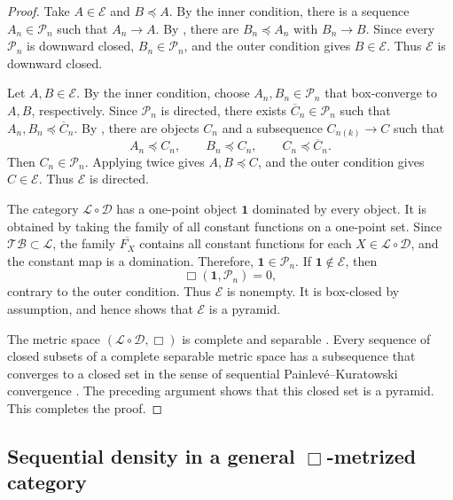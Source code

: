 \documentclass{amsart}
\theoremstyle{plain}
\theoremstyle{definition}
\theoremstyle{remark}
\newcommand{\D}{\mathcal{D}}
\renewcommand{\L}{\mathcal{L}}
\newcommand{\TB}{\mathcal{TB}}
\begin{document}
\begin{proof}
Take $A\in\mathcal E$ and $B\preceq A$. By the inner condition, there is a sequence $A_n\in\mathcal P_n$ such that $A_n\to A$. By \cite[Lemma~5.4]{gds2}, there are $B_n\preceq A_n$ with $B_n\to B$. Since every $\mathcal P_n$ is downward closed, $B_n\in\mathcal P_n$, and the outer condition gives $B\in\mathcal E$. Thus $\mathcal E$ is downward closed.

Let $A,B\in\mathcal E$. By the inner condition, choose $A_n,B_n\in\mathcal P_n$ that box-converge to $A,B$, respectively. Since $\mathcal P_n$ is directed, there exists $\overline C_n\in\mathcal P_n$ such that $A_n,B_n\preceq\overline C_n$. By \cite[Lemma~5.6]{gds2}, there are objects $C_n$ and a subsequence $C_{n(k)}\to C$ such that
\[A_n\preceq C_n,\qquad B_n\preceq C_n,\qquad C_n\preceq\overline C_n.\]
Then $C_n\in\mathcal P_n$. Applying  twice gives $A,B\preceq C$, and the outer condition gives $C\in\mathcal E$. Thus $\mathcal E$ is directed.

The category $\L\circ\D$ has a one-point object $\mathbf 1$ dominated by every object. It is obtained by taking the family of all constant functions on a one-point set. Since $\TB\subset\L$, the family $\overline{F_X}$ contains all constant functions for each $X\in\L\circ\D$, and the constant map is a domination. Therefore, $\mathbf 1\in\mathcal P_n$. If $\mathbf 1\notin\mathcal E$, then
\[\Box(\mathbf 1,\mathcal P_n)=0,\]
contrary to the outer condition. Thus $\mathcal E$ is nonempty. It is box-closed by assumption, and hence  shows that $\mathcal E$ is a pyramid.

The metric space $(\L\circ\D,\Box)$ is complete and separable \cite[Theorem~4.10]{gds2}. Every sequence of closed subsets of a complete separable metric space has a subsequence that converges to a closed set in the sense of sequential Painlev\'e--Kuratowski convergence \cite[Theorem~5.2.12]{beer1993topologies}\cite[Lemma~2.11]{gds2}. The preceding argument shows that this closed set is a pyramid. This completes the proof.
\end{proof}

\subsection{Sequential density in a general \texorpdfstring{$\Box$}{box}-metrized category}
\end{document}
